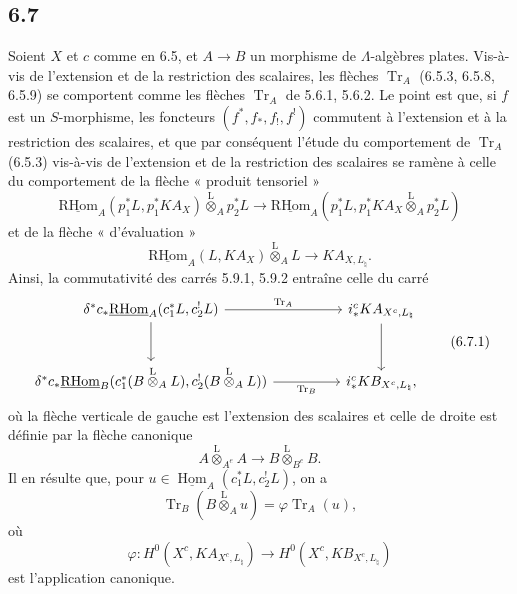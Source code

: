 \documentclass[11pt]{article}
\DeclareMathOperator{\Hom}{Hom}
\providecommand{\RHom}{\mathrm{RHom}}
\providecommand{\uRHom}{\underline{\RHom}}
\providecommand{\uHom}{\underline{\Hom}}
\providecommand{\Tr}{\operatorname{Tr}}
\providecommand{\Tr}{\operatorname{Tr}}
\providecommand{\lten}{\overset{\mathrm L}{\otimes}}
\providecommand{\Tr}{\operatorname{Tr}}
\providecommand{\RHom}{\mathrm{RHom}}
\providecommand{\Hom}{\operatorname{Hom}}
\providecommand{\lten}{\overset{\mathrm L}{\otimes}}
\providecommand{\RHom}{\mathrm R\mathcal{H}om}
\providecommand{\lten}{\overset{\mathrm L}{\otimes}}
\providecommand{\Tr}{\operatorname{Tr}}
\providecommand{\lten}{\overset{\mathrm L}{\otimes}}
\providecommand{\lten}{\overset{\mathrm L}{\otimes}}
\providecommand{\lten}{\overset{\mathrm L}{\otimes}}
\providecommand{\RHom}{\mathrm{RHom}}
\providecommand{\Hom}{\operatorname{Hom}}
\providecommand{\Tr}{\operatorname{Tr}}
\providecommand{\lten}{\overset{\mathrm L}{\otimes}}
\begin{document}
\subsection*{6.7}
Soient $X$ et $c$ comme en 6.5, et $A\to B$ un morphisme de $\Lambda$-algèbres plates. Vis-à-vis de l'extension et de la restriction des scalaires, les flèches $\Tr_A$ (6.5.3, 6.5.8, 6.5.9) se comportent comme les flèches $\Tr_A$ de 5.6.1, 5.6.2. Le point est que, si $f$ est un $S$-morphisme, les foncteurs $(f^*,f_*,f_!,f^!)$ commutent à l'extension et à la restriction des scalaires, et que par conséquent l'étude du comportement de $\Tr_A$ (6.5.3) vis-à-vis de l'extension et de la restriction des scalaires se ramène à celle du comportement de la flèche « produit tensoriel »
\[
\uRHom_A(p_1^*L,p_1^*KA_X)\lten_Ap_2^*L
\longrightarrow
\uRHom_A(p_1^*L,p_1^*KA_X\lten_Ap_2^*L)
\]
et de la flèche « d'évaluation »
\[
\uRHom_A(L,KA_X)\lten_A L\longrightarrow KA_{X,L_{\natural}}.
\]
Ainsi, la commutativité des carrés 5.9.1, 5.9.2 entraîne celle du carré
\begin{equation}
\begin{tikzcd}[column sep=huge,row sep=large]
\delta^*c_*\uRHom_A(c_1^*L,c_2^!L) \arrow[r,"\Tr_A"] \arrow[d]
& i_*^cKA_{X^c,L_{\natural}} \arrow[d]\\
\delta^*c_*\uRHom_B(c_1^*(B\lten_A L),c_2^!(B\lten_A L)) \arrow[r,"\Tr_B"']
& i_*^cKB_{X^c,L_{\natural}},
\end{tikzcd}
\tag{6.7.1}
\end{equation}
où la flèche verticale de gauche est l'extension des scalaires et celle de droite est définie par la flèche canonique
\[
A\lten_{A^e}A\longrightarrow B\lten_{B^e}B.
\]
Il en résulte que, pour $u\in\uHom_A(c_1^*L,c_2^!L)$, on a
\begin{equation}
\Tr_B(B\lten_Au)=\varphi\Tr_A(u),
\tag{6.7.2}
\end{equation}
où
\[
\varphi:H^0(X^c,KA_{X^c,L_{\natural}})\longrightarrow H^0(X^c,KB_{X^c,L_{\natural}})
\]
est l'application canonique.
\end{document}
